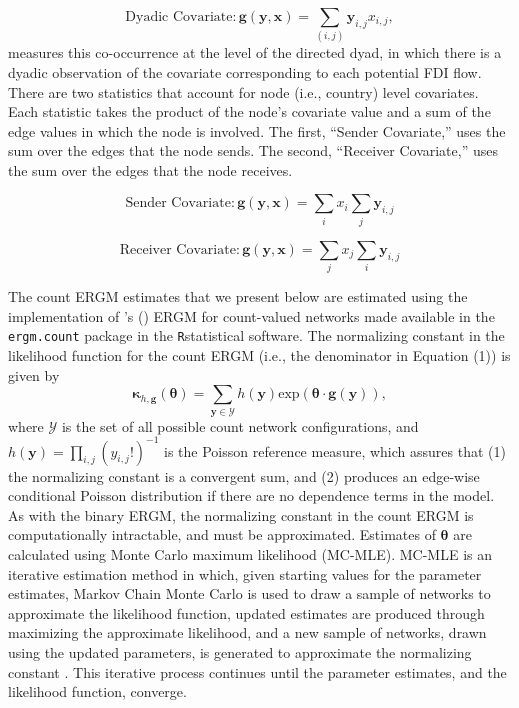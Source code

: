 \documentclass[reqno,onecolumn,letterpaper,12pt]{article}
\newcommand\citeapos[1]{\citeauthor{#1}'s (\citeyear{#1})}
\newcommand{\R}{\texttt{R}} %
\begin{document}
$$ \text{Dyadic Covariate}: \bm{g(y,x)} = \sum_{(i,j)} \bm{y}_{i,j}x_{i,j},$$ measures this co-occurrence at the level of the directed dyad, in which there is a dyadic observation of the covariate corresponding to each potential FDI flow. There are two statistics that account for node (i.e., country) level covariates. Each statistic takes the product of the node's covariate value and a sum of the edge values in which the node is involved. The first, ``Sender Covariate,'' uses the sum over the edges that the node sends. The second, ``Receiver Covariate,'' uses the sum over the edges that the node receives.

$$ \text{Sender Covariate}: \bm{g(y,x)} = \sum_{i}x_i \sum_{j} \bm{y}_{i,j}$$

$$ \text{Receiver Covariate}: \bm{g(y,x)} = \sum_{j}x_j \sum_{i} \bm{y}_{i,j}$$

The count ERGM estimates that we present below are estimated using the implementation of \citeapos{krivitsky2012exponential} ERGM for count-valued networks made available in the \texttt{ergm.count} \citep{ergmcount} package in the \R \space statistical software. The normalizing constant in the likelihood function for the count ERGM (i.e., the denominator in Equation (1)) is given by $$ \bm{\kappa}_{h,\bm{g}}(\bm{\theta}) =  \sum_{\bm{y} \in \bm{\mathcal{Y} } }  h(\bm{y})\text{exp}( \bm {\theta} \cdot \bm{g} (\bm{y}) ), $$ where $\bm{\mathcal{Y} }$ is the set of all possible count network configurations, and $h(\bm{y}) = \prod_{i,j} (y_{i,j}!)^{-1}$ is the Poisson reference measure, which assures that (1) the normalizing constant is a convergent sum, and (2) produces an edge-wise conditional Poisson distribution if there are no dependence terms in the model. As with the binary ERGM, the normalizing constant in the count ERGM is computationally intractable, and must be approximated. Estimates of $\bm {\theta} $ are calculated using Monte Carlo maximum likelihood (MC-MLE). MC-MLE is an iterative estimation method in which, given starting values for the parameter estimates, Markov Chain Monte Carlo is used to draw a sample of networks to approximate the likelihood function, updated estimates are produced through maximizing the approximate likelihood, and a new sample of networks, drawn using the updated parameters, is generated to approximate the normalizing constant \citep{snijders2002markov}. This iterative process continues until the parameter estimates, and the likelihood function, converge.
\end{document}
